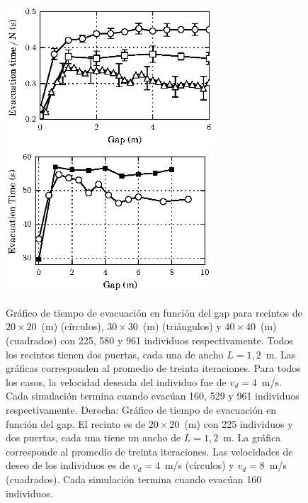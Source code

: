 \begin{figure}[H]
    \centering
    \includegraphics[height=5.3cm]{figuras/fig1_version0.eps}
    \includegraphics[height=5.3cm]{figuras/gap_vste_225_v4_v8.eps}
    \caption[width=5cm]{Gráfico de tiempo de evacuación en función del gap para recintos de $20\times 20$~(m) (círculos), $30\times 30$~(m) (triángulos) y $40\times 40$~(m) (cuadrados) con 225, 580 y 961 individuos respectivamente. Todos los recintos tienen dos puertas, cada una de ancho $L=1,2$~m. Las gráficas corresponden al promedio de treinta iteraciones. Para todos los casos, la velocidad deseada del individuo fue de $v_d=4$~m/s. Cada simulación termina cuando evacúan 160, 529 y 961 individuos respectivamente.
    Derecha: Gráfico de tiempo de evacuación en función del gap. El recinto es de $20\times 20$~(m) con 225 individuos y dos puertas, cada una tiene un ancho de $L=1,2$~m. La gráfica corresponde al promedio de treinta iteraciones. Las velocidades de deseo de los individuos es de $v_d=4$~m/s (círculos) y $v_d=8$~m/s (cuadrados). Cada simulación termina cuando evacúan 160 individuos.}
    \label{gap_vste_vel_n}
\end{figure}




